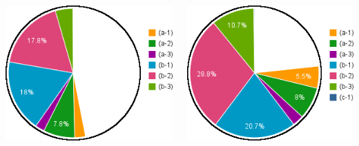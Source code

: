 \documentclass[compress]{beamer}
\begin{document}
\begin{frame}
\begin{columns}
\includegraphics[width=\linewidth]{chart2d_4mu_200.png}

\includegraphics[width=\linewidth]{chart2d_4mu_400.png}


\end{columns}
\end{frame}
\end{document}
